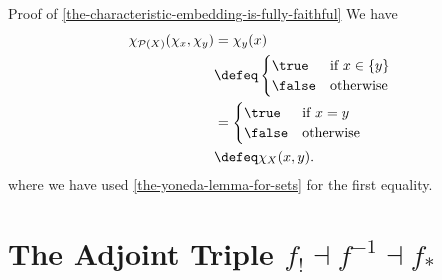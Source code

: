 \begin{Proof}{Proof of \cref{the-characteristic-embedding-is-fully-faithful}}%
    We have
    \begin{align*}
        \chi_{\mathcal{P}(X)}(\chi_{x},\chi_{y}) &=      \chi_{y}(x)\\
                                                 &\defeq \begin{cases}
                                                             \true  &\text{if $x\in\{y\}$}\\
                                                             \false &\text{otherwise}
                                                         \end{cases}\\
                                                 &=      \begin{cases}
                                                             \true  &\text{if $x=y$}\\
                                                             \false &\text{otherwise}
                                                         \end{cases}\\
                                                 &\defeq \chi_{X}(x,y).
    \end{align*}
    where we have used \cref{the-yoneda-lemma-for-sets} for the first equality.
\end{Proof}
\section{The Adjoint Triple $f_{!}\dashv f^{-1}\dashv f_{*}$}\label{section-the-adjoint-triple-f-shriek-f-minus-one-f-star}
